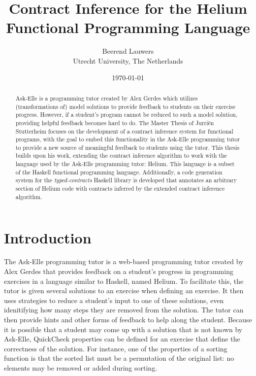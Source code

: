 \documentclass[10pt]{report}
\author{
	Beerend Lauwers\\
	Utrecht University, The Netherlands}
\date{\today}
\title{Contract Inference for the Helium Functional Programming Language}
\begin{document}
\maketitle


\begin{abstract}
Ask-Elle is a programming tutor created by Alex Gerdes \cite{Gerdes:2012:phd} which utilizes (transformations of) model solutions to provide feedback to students on their exercise progress.
However, if a student's program cannot be reduced to such a model solution, providing helpful feedback becomes hard to do. 
The Master Thesis of Jurri\"en Stutterheim \cite{Stutterheim:2013:thesis} focuses on the development of a contract inference system for functional programs, with the goal to embed this functionality in the Ask-Elle programming tutor to provide a new source of meaningful feedback to students using the tutor.
This thesis builds upon his work, extending the contract inference algorithm to work with the language used by the Ask-Elle programming tutor: Helium.
This language is a subset of the Haskell functional programming language.
Additionally, a code generation system  for the \textit{typed-contracts} Haskell library is developed that annotates an arbitrary section of Helium code with contracts inferred by the extended contract inference algorithm.
\end{abstract}

\tableofcontents

\chapter{Introduction}

The Ask-Elle programming tutor is a web-based programming tutor created by Alex Gerdes \cite{Gerdes:2012:phd} that provides feedback on a student's progress in programming exercises in a language similar to Haskell, named Helium.
To facilitate this, the tutor is given several solutions to an exercise when defining an exercise.
It then uses strategies to reduce a student's input to one of these solutions, even idenitifying how many steps they are removed from the solution.
The tutor can then provide hints and other forms of feedback to help along the student.
Because it is possible that a student may come up with a solution that is not known by Ask-Elle, QuickCheck \cite{Claessen:2000p592} properties can be defined for an exercise that define the correctness of the solution.
For instance, one of the properties of a sorting function is that the sorted list must be a permutation of the original list: no elements may be removed or added during sorting.
\end{document}
